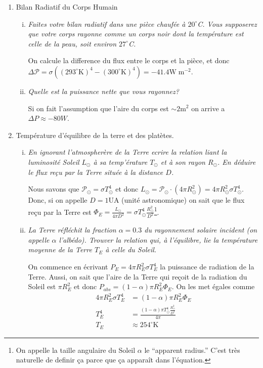 \documentclass[10pt]{report}
\begin{document}
\begin{enumerate}[1)]
    \item Bilan Radiatif du Corps Humain
        \begin{enumerate}[i)]
            \item \emph{Faites votre bilan radiatif dans une pi\`ece chauf\'ee \`a $20^\circ$C. Vous supposerez que votre corps rayonne comme un corps noir dont la temp\'erature est celle de la peau, soit environ $27^\circ$C.} 
                
                On calcule la difference du flux entre le corps et la pi\`ece, et donc $\Delta \mathcal{P} = \sigma\left( (293^\circ \mathrm{K})^4 - (300^\circ\mathrm{K})^4 \right) = \boxed{-41.4\mathrm{W\;m^{-2}}}$. 
            \item \emph{Quelle est la puissance nette que vous rayonnez?}
                
                Si on fait l'assumption que l'aire du corps est $\sim 2 \mathrm{m^2}$ on arrive a $\boxed{\Delta P \approx -80 W}$.
        \end{enumerate}
    \item Temp\'erature d'\'equilibre de la terre et des plat\`etes.
        \begin{enumerate}[i)]
            \item \emph{En ignorant l'atmospher\`ere de la Terre ecrire la relation liant la luminosit\'e Soleil $L_{\odot}$ \`a sa temp'\'erature $T_{\odot}$ et \`a son rayon $R_\odot$. En d\'eduire le flux re\c{c}u par la Terre situ\'ee \`a la distance $D$.}

                Nous savons que $\mathcal{P}_\odot = \sigma T_\odot^4$ et donc $L_\odot = \mathcal{P}_\odot \cdot (4\pi R_{\odot}^2) = \boxed{4\pi R_{\odot}^2 \sigma T_{\odot}^4}$. Donc, si on appelle $D = 1\mathrm{UA}$ (unit\'e astronomique) on sait que le flux re\c{c}u par la Terre est $\Phi_E = \frac{L_{\odot}}{4\pi D^2} = \sigma T_{\odot}^4 \frac{R_{\odot}^2}{D^2}$\footnote{On appelle la taille angulaire du Soleil $\alpha$ le ``apparent radius.'' C'est tr\`es naturelle de definir \c{c}a parce que \c{c}a appara\^it dans l'\'equation.}.
            \item \emph{La Terre r\'efl\'echit la fraction $\alpha = 0.3$ du rayonnement solaire incident (on appelle $\alpha$ l'alb\'edo). Trouver la relation qui, \`a l'\'equilibre, lie la temp\'erature moyenne de la Terre $T_E$ \`a celle du Soleil.}

                On commence en \'ecrivant $P_E = 4\pi R_E^2 \sigma T_E^4$ la puissance de radiation de la Terre. Aussi, on sait que l'aire de la Terre qui re\c{c}oit de la radiation du Soleil est $\pi R_E^2$ et donc $P_{abs} = (1-\alpha)\pi R_E^2 \Phi_E$. On les met \'egales comme
                \begin{align}
                    4\pi R_E^2 \sigma T_E^4 &= (1-\alpha)\pi R_E^2 \Phi_E\\
                    T_E^4 &= \frac{(1-\alpha)\pi T_{\odot}^4\frac{R_{\odot}^2}{D^2}}{4\pi}\\
                    T_E &\approx 254^\circ \mathrm{K}
                \end{align}


\end{enumerate}
\end{enumerate}
\end{document}

